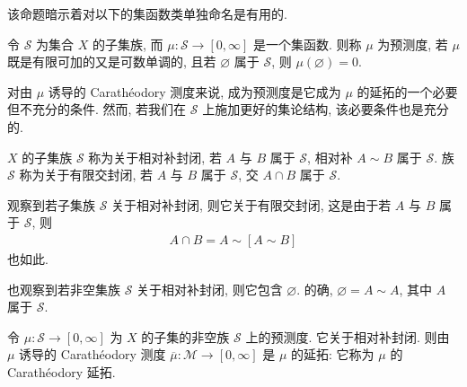 \documentclass[../../main.tex]{subfiles}
\begin{document}
该命题暗示着对以下的集函数类单独命名是有用的.

\begin{definition}[预测度]\label{definition:ch17-premeasure}
令 $\mathcal{S}$ 为集合 $X$ 的子集族, 而 $\mu:\mathcal{S}\to[0,\infty]$ 是一个集函数. 则称 $\mu$ 为预测度, 若 $\mu$ 既是有限可加的又是可数单调的, 且若 $\varnothing$ 属于 $\mathcal{S}$, 则 $\mu(\varnothing)=0$.
\end{definition}

对由 $\mu$ 诱导的 Carath\'eodory 测度来说, 成为预测度是它成为 $\mu$ 的延拓的一个必要但不充分的条件. 然而, 若我们在 $\mathcal{S}$ 上施加更好的集论结构, 该必要条件也是充分的.

\begin{definition}[相对补封闭与有限交封闭]\label{definition:ch17-closedness}
$X$ 的子集族 $\mathcal{S}$ 称为关于相对补封闭, 若 $A$ 与 $B$ 属于 $\mathcal{S}$, 相对补 $A\sim B$ 属于 $\mathcal{S}$. 族 $\mathcal{S}$ 称为关于有限交封闭, 若 $A$ 与 $B$ 属于 $\mathcal{S}$, 交 $A\cap B$ 属于 $\mathcal{S}$.
\end{definition}

观察到若子集族 $\mathcal{S}$ 关于相对补封闭, 则它关于有限交封闭, 这是由于若 $A$ 与 $B$ 属于 $\mathcal{S}$, 则
\begin{align*}
A\cap B=A\sim[A\sim B]
\end{align*}
也如此.

也观察到若非空集族 $\mathcal{S}$ 关于相对补封闭, 则它包含 $\varnothing$. 的确, $\varnothing=A\sim A$, 其中 $A$ 属于 $\mathcal{S}$.

\begin{theorem}\label{theorem:ch17-premeasure-extension}
令 $\mu:\mathcal{S}\to[0,\infty]$ 为 $X$ 的子集的非空族 $\mathcal{S}$ 上的预测度. 它关于相对补封闭. 则由 $\mu$ 诱导的 Carath\'eodory 测度 $\overline{\mu}:\mathcal{M}\to[0,\infty]$ 是 $\mu$ 的延拓: 它称为 $\mu$ 的 Carath\'eodory 延拓.
\end{theorem}
\end{document}
